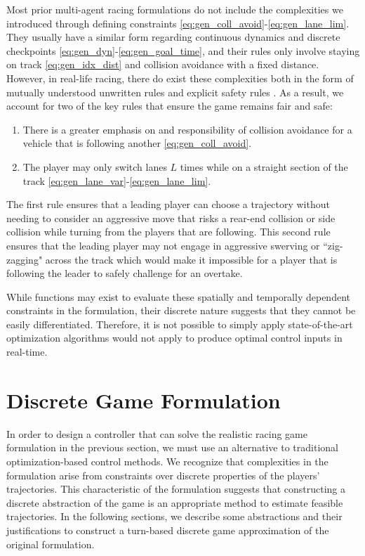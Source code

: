 Most prior multi-agent racing formulations \cite{Wang2019, Wang2021, Li2021} do not include the complexities we introduced through defining constraints \eqref{eq:gen_coll_avoid}-\eqref{eq:gen_lane_lim}. They usually have a similar form regarding continuous dynamics and discrete checkpoints \eqref{eq:gen_dyn}-\eqref{eq:gen_goal_time}, and their rules only involve staying on track \eqref{eq:gen_idx_dist} and collision avoidance with a fixed distance. However, in real-life racing, there do exist these complexities both in the form of mutually understood unwritten rules and explicit safety rules \cite{racingrules}. As a result, we account for two of the key rules that ensure the game remains fair and safe:
\begin{enumerate}
    \item There is a greater emphasis on and responsibility of collision avoidance for a vehicle that is following another \eqref{eq:gen_coll_avoid}.
    \item The player may only switch lanes $L$ times while on a straight section of the track \eqref{eq:gen_lane_var}-\eqref{eq:gen_lane_lim}.
\end{enumerate}

The first rule ensures that a leading player can choose a trajectory without needing to consider an aggressive move that risks a rear-end collision or side collision while turning from the players that are following. This second rule ensures that the leading player may not engage in aggressive swerving or ``zig-zagging" across the track which would make it impossible for a player that is following the leader to safely challenge for an overtake. 

While functions may exist to evaluate these spatially and temporally dependent constraints in the formulation, their discrete nature suggests that they cannot be easily differentiated. Therefore, it is not possible to simply apply state-of-the-art optimization algorithms would not apply to produce optimal control inputs in real-time. 

\section{Discrete Game Formulation} \label{section:discgame}
In order to design a controller that can solve the realistic racing game formulation in the previous section, we must use an alternative to traditional optimization-based control methods. We recognize that complexities in the formulation arise from constraints over discrete properties of the players' trajectories. This characteristic of the formulation suggests that constructing a discrete abstraction of the game is an appropriate method to estimate feasible trajectories. In the following sections, we describe some abstractions and their justifications to construct a turn-based discrete game approximation of the original formulation. 


